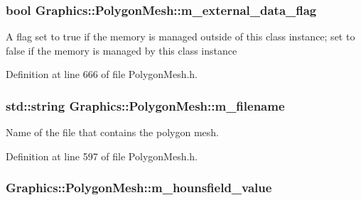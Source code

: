 \hypertarget{class_graphics_1_1_polygon_mesh_a62bdefdd8c44bcc211f4472a756e835f}{
\subsubsection[{m\_\-external\_\-data\_\-flag}]{\setlength{\rightskip}{0pt plus 5cm}bool {\bf Graphics::PolygonMesh::m\_\-external\_\-data\_\-flag}}}
\label{class_graphics_1_1_polygon_mesh_a62bdefdd8c44bcc211f4472a756e835f}
A flag set to true if the memory is managed outside of this class instance; set to false if the memory is managed by this class instance 

Definition at line 666 of file PolygonMesh.h.

\hypertarget{class_graphics_1_1_polygon_mesh_a455483e27861ed72beacd76e70c438bb}{
\subsubsection[{m\_\-filename}]{\setlength{\rightskip}{0pt plus 5cm}std::string {\bf Graphics::PolygonMesh::m\_\-filename}}}
\label{class_graphics_1_1_polygon_mesh_a455483e27861ed72beacd76e70c438bb}


Name of the file that contains the polygon mesh. 



Definition at line 597 of file PolygonMesh.h.

\hypertarget{class_graphics_1_1_polygon_mesh_a2c2e3ac536ecf140a464fe074b4a6cb0}{
\subsubsection[{m\_\-hounsfield\_\-value}]{ {\bf Graphics::PolygonMesh::m\_\-hounsfield\_\-value}}}
\label{class_graphics_1_1_polygon_mesh_a2c2e3ac536ecf140a464fe074b4a6cb0}


